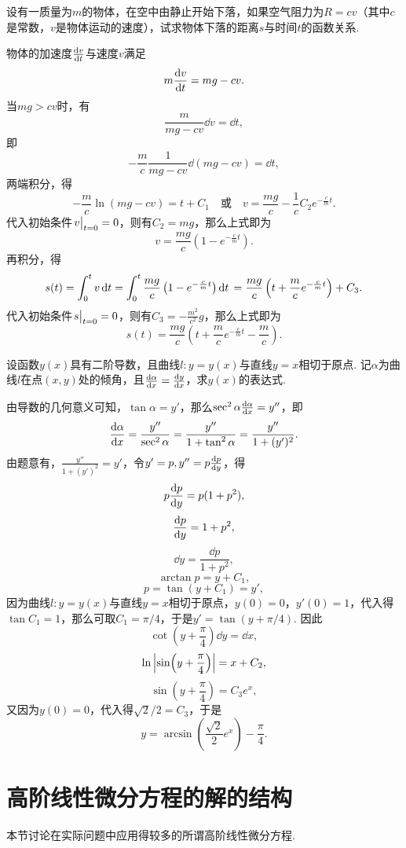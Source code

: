 \begin{example}
设有一质量为\(m\)的物体，在空中由静止开始下落，如果空气阻力为\(R = cv\)（其中\(c\)是常数，\(v\)是物体运动的速度），试求物体下落的距离\(s\)与时间\(t\)的函数关系.
\begin{solution}
物体的加速度\(\dv{v}{t}\)与速度\(v\)满足\[
m \dv{v}{t} = mg - cv.
\]当\(mg>cv\)时，有\[
\frac{m}{mg-cv} \dd{v} = \dd{t},
\]即\[
-\frac{m}{c} \frac{1}{mg-cv} \dd(mg-cv) = \dd{t},
\]两端积分，得\[
-\frac{m}{c} \ln(mg-cv) = t + C_1
\quad\text{或}\quad
v = \frac{mg}{c} - \frac{1}{c} C_2 e^{-\frac{c}{m} t}.
\]代入初始条件\(\eval{v}_{t=0} = 0\)，则有\(C_2 = mg\)，那么上式即为\[
v = \frac{mg}{c} \left( 1 - e^{-\frac{c}{m} t} \right).
\]再积分，得\[
s(t) = \int_0^t v \dd{t}
= \int_0^t \frac{mg}{c} \left( 1 - e^{-\frac{c}{m} t} \right) \dd{t} \\
= \frac{mg}{c} \left( t + \frac{m}{c} e^{-\frac{c}{m} t} \right) + C_3.
\]
代入初始条件\(\eval{s}_{t=0} = 0\)，则有\(C_3 = -\frac{m^2}{c^2} g\)，那么上式即为\[
s(t) = \frac{mg}{c} \left( t + \frac{m}{c} e^{-\frac{c}{m} t} - \frac{m}{c} \right).
\]
\end{solution}
\end{example}

\begin{example}
设函数\(y(x)\)具有二阶导数，且曲线\(l: y=y(x)\)与直线\(y=x\)相切于原点.
记\(\alpha\)为曲线\(l\)在点\((x,y)\)处的倾角，且\(\dv{\alpha}{x}=\dv{y}{x}\)，求\(y(x)\)的表达式.
\begin{solution}
由导数的几何意义可知，\(\tan\alpha=y'\)，那么\(\sec^2\alpha \dv{\alpha}{x} = y''\)，即\[
\dv{\alpha}{x} = \frac{y''}{\sec^2\alpha}
= \frac{y''}{1+\tan^2\alpha}
= \frac{y''}{1+(y')^2}.
\]由题意有，\(\frac{y''}{1+(y')^2} = y'\)，令\(y' = p, y'' = p\dv{p}{y}\)，得\[
p\dv{p}{y} = p(1+p^2),
\]\[
\dv{p}{y} = 1+p^2,
\]\[
\dd{y} = \frac{\dd{p}}{1+p^2},
\]\[
\arctan p = y + C_1,
\]\[
p = \tan(y+C_1) = y',
\]因为曲线\(l: y=y(x)\)与直线\(y=x\)相切于原点，\(y(0) = 0\)，\(y'(0) = 1\)，代入得\(\tan C_1 = 1\)，那么可取\(C_1 = \pi/4\)，于是\(y' = \tan(y+\pi/4)\).%
因此\[
\cot(y+\frac{\pi}{4}) \dd{y} = \dd{x},
\]\[
\ln\abs{\sin(y+\frac{\pi}{4})} = x + C_2,
\]\[
\sin(y+\frac{\pi}{4}) = C_3 e^x,
\]又因为\(y(0) = 0\)，代入得\(\sqrt{2}/2 = C_3\)，于是\[
y = \arcsin(\frac{\sqrt{2}}{2} e^x) - \frac{\pi}{4}.
\]
\end{solution}
\end{example}

\section{高阶线性微分方程的解的结构}
本节讨论在实际问题中应用得较多的所谓高阶线性微分方程.

